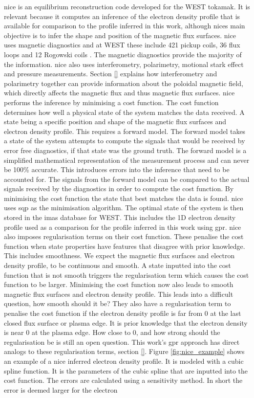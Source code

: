 \gls{nice} is an equilibrium reconstruction code developed for the WEST tokamak. It is relevant because it computes an inference of the electron density profile that is available for comparison to the profile inferred in this work, although \glspl{nice} main objective is to infer the shape and position of the magnetic flux surfaces. \gls{nice} uses magnetic diagnostics and at WEST these include 421 pickup coils, 36 flux loops and 12 Rogowski coils \cite{westmagdiag}. The magnetic diagnostics provide the majority of the information. \gls{nice} also uses interferometry, polarimetry, motional stark effect and pressure measurements. Section \ref{} explains how interferometry and polarimetry together can provide information about the poloidal magnetic field, which directly affects the magnetic flux and thus magnetic flux surfaces. \gls{nice} performs the inference by minimising a cost function. The cost function determines how well a physical state of the system matches the data received. A state being a specific position and shape of the magnetic flux surfaces and electron density profile. This requires a forward model. The forward model takes a state of the system attempts to compute the signals that would be received by error free diagnostics, if that state was the ground truth. The forward model is a simplified mathematical representation of the measurement process and can never be 100\% accurate. This introduces errors into the inference that need to be accounted for. The signals from the forward model can be compared to the actual signals received by the diagnostics in order to compute the cost function. By minimising the cost function the state that best matches the data is found. \gls{nice} uses \gls{sqp} as the minimisation algorithm. The optimal state of the system is then stored in the \gls{imas} database for WEST. This includes the 1D electron density profile used as a comparison for the profile inferred in this work using \gls{gpr}. \gls{nice} also imposes regularisation terms on their cost function. These penalise the cost function when state properties have features that disagree with prior knowledge. This includes smoothness. We expect the magnetic flux surfaces and electron density profile, to be continuous and smooth. A state inputted into the cost function that is not smooth triggers the regularisation term which causes the cost function to be larger. Minimising the cost function now also leads to smooth magnetic flux surfaces and electron density profile. This leads into a difficult question, how smooth should it be? They also have a regularisation term to penalise the cost function if the electron density profile is far from 0 at the last closed flux surface or plasma edge. It is prior knowledge that the electron density is near 0 at the plasma edge. How close to 0, and how strong should the regularisation be is still an open question. This work's \gls{gpr} approach has  direct analogs to these regularisation terms, section \ref{}. Figure \ref{fig:nice_example} shows an example of a \gls{nice} inferred electron density profile. It is modeled with a cubic spline function. It is the parameters of the cubic spline that are inputted into the cost function. The errors are calculated using a sensitivity method. In short the error is deemed larger for the electron 